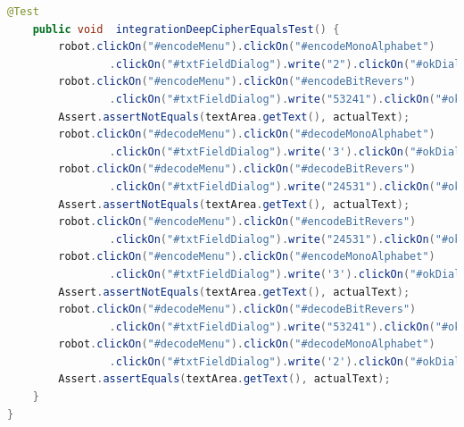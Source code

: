 \documentclass[a4paper,12pt]{article}
\begin{document}
\begin{lstlisting}[language=java, caption=класс MainWindowUiIntegrationTest, label=listing_mainWindow:MainWindowUiIntegrationTestn]
    @Test
    public void  integrationDeepCipherEqualsTest() {
        robot.clickOn("#encodeMenu").clickOn("#encodeMonoAlphabet")
                .clickOn("#txtFieldDialog").write("2").clickOn("#okDialog");
        robot.clickOn("#encodeMenu").clickOn("#encodeBitRevers")
                .clickOn("#txtFieldDialog").write("53241").clickOn("#okDialog");
        Assert.assertNotEquals(textArea.getText(), actualText);
        robot.clickOn("#decodeMenu").clickOn("#decodeMonoAlphabet")
                .clickOn("#txtFieldDialog").write('3').clickOn("#okDialog");
        robot.clickOn("#decodeMenu").clickOn("#decodeBitRevers")
                .clickOn("#txtFieldDialog").write("24531").clickOn("#okDialog");
        Assert.assertNotEquals(textArea.getText(), actualText);
        robot.clickOn("#encodeMenu").clickOn("#encodeBitRevers")
                .clickOn("#txtFieldDialog").write("24531").clickOn("#okDialog");
        robot.clickOn("#encodeMenu").clickOn("#encodeMonoAlphabet")
                .clickOn("#txtFieldDialog").write('3').clickOn("#okDialog");
        Assert.assertNotEquals(textArea.getText(), actualText);
        robot.clickOn("#decodeMenu").clickOn("#decodeBitRevers")
                .clickOn("#txtFieldDialog").write("53241").clickOn("#okDialog");
        robot.clickOn("#decodeMenu").clickOn("#decodeMonoAlphabet")
                .clickOn("#txtFieldDialog").write('2').clickOn("#okDialog");
        Assert.assertEquals(textArea.getText(), actualText);
    }
}
\end{lstlisting}
\end{document}
